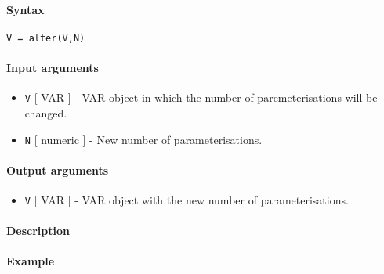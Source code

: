 


	\paragraph{Syntax}

\begin{verbatim}
V = alter(V,N)
\end{verbatim}

\paragraph{Input arguments}

\begin{itemize}
\item
  \texttt{V} {[} VAR {]} - VAR object in which the number of
  paremeterisations will be changed.
\item
  \texttt{N} {[} numeric {]} - New number of parameterisations.
\end{itemize}

\paragraph{Output arguments}

\begin{itemize}
\itemsep1pt\parskip0pt
\item
  \texttt{V} {[} VAR {]} - VAR object with the new number of
  parameterisations.
\end{itemize}

\paragraph{Description}

\paragraph{Example}


